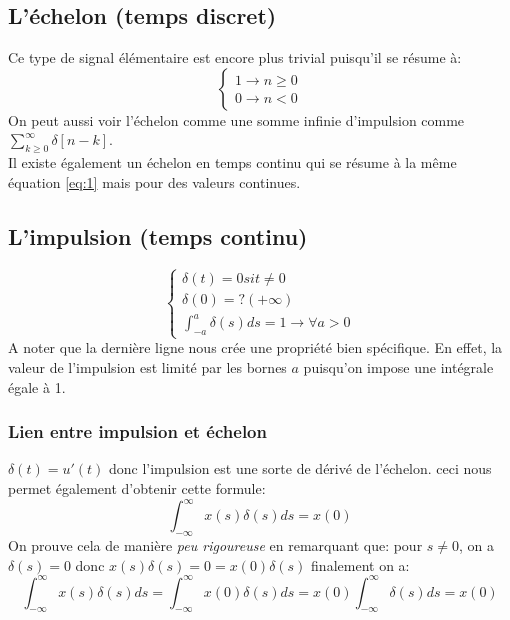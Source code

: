 \documentclass{report}
\begin{document}
\subsection{L'échelon (temps discret)}
Ce type de signal élémentaire est encore plus trivial puisqu'il se résume à:
\begin{equation}\label{eq:1}
\begin{cases}
1 \rightarrow n \geq 0 \\
0 \rightarrow n < 0
\end{cases}
\end{equation}
On peut aussi voir l'échelon comme une somme infinie d'impulsion comme $\sum_{k \geq 0}^{\infty} \delta[n-k]$.\\
Il existe également un échelon en temps continu qui se résume à la même équation \ref{eq:1} mais pour des valeurs continues.

\subsection{L'impulsion (temps continu)}
\begin{equation}
\begin{cases}
\delta (t) = 0 si t \neq 0\\
\delta (0) = ?(+\infty)\\
\int_{-a}^a \delta (s) ds = 1 \rightarrow \forall a > 0
\end{cases}
\end{equation}
A noter que la dernière ligne nous crée une propriété bien spécifique. En effet, la valeur de l'impulsion est limité par les bornes $a$ puisqu'on impose une intégrale égale à 1.

\subsubsection{Lien entre impulsion et échelon}
$\delta (t) = u'(t)$ donc l'impulsion est une sorte de dérivé de l'échelon. ceci nous permet également d'obtenir cette formule:
\begin{equation}
\int_{-\infty}^{\infty} x(s) \delta(s)ds = x(0)
\end{equation}
On prouve cela de manière \textit{peu rigoureuse} en remarquant que: pour $s \neq 0$, on a $\delta(s) = 0$ donc $x(s)\delta(s) = 0 = x(0)\delta(s)$ finalement on a:
\begin{equation}
\int_{-\infty}^{\infty} x(s) \delta(s)ds = \int_{-\infty}^{\infty} x(0) \delta(s)ds = x(0) \int_{-\infty}^{\infty} \delta(s)ds = x(0)
\end{equation} 
\end{document}
